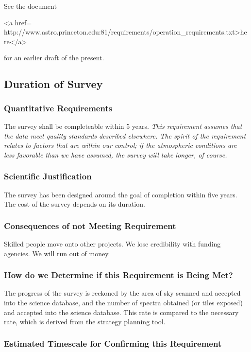 See the document 
\begin{rawhtml}
<a href=
http://www.astro.princeton.edu:81/requirements/operation_requirements.txt>here</a>\end{rawhtml}
for an earlier draft of the present. 

\subsection{Duration of Survey}
\label{sec:length}
\subsubsection{Quantitative Requirements}

The survey shall be completeable within 5 years.  {\it This requirement assumes 
that the data meet quality standards described elsewhere.  The spirit of the 
requirement relates to factors that are within our control; if the 
atmospheric conditions are less favorable than we have assumed, the survey 
will take longer, of course.}

\subsubsection{Scientific Justification}

The survey has been designed around the goal of completion within five
years. The cost of the survey depends on its duration.  

\subsubsection{Consequences of not Meeting Requirement}

Skilled people move onto other projects.  We lose credibility with 
funding agencies.  We will run out of money.%

\subsubsection{How do we Determine if this Requirement is Being Met? }

The progress of the survey is reckoned by the area of sky scanned and 
accepted into the science database, and the number of spectra obtained (or 
tiles exposed) and accepted into the science database.  This rate is compared 
to the necessary rate, which is derived from the strategy planning tool. 

\subsubsection{Estimated Timescale for Confirming this Requirement }

